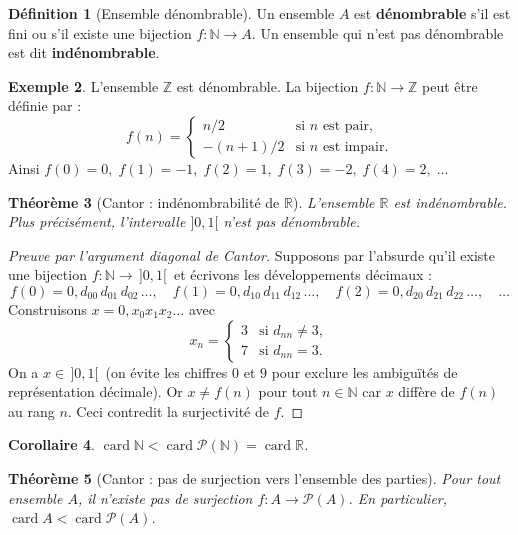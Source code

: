 \documentclass[12pt,a4paper,openany]{book}
\theoremstyle{definition}
\newtheorem{definition}{Définition}[chapter]
\newtheorem{exemple}[definition]{Exemple}
\theoremstyle{plain}
\newtheorem{theoreme}[definition]{Théorème}
\newtheorem{corollaire}[definition]{Corollaire}
\theoremstyle{remark}
\newcommand{\N}{\mathbb{N}}
\newcommand{\Z}{\mathbb{Z}}
\newcommand{\R}{\mathbb{R}}
\newcommand{\powerset}{\mathcal{P}}
\DeclareMathOperator{\card}{card}
\begin{document}
\begin{definition}[Ensemble dénombrable]\label{def:denombrable}
Un ensemble $A$ est \textbf{dénombrable} s'il est fini ou s'il existe une
bijection $f \colon \N \to A$. Un ensemble qui n'est pas dénombrable est dit
\textbf{indénombrable}.
\end{definition}

\begin{exemple}\label{ex:Z-denombrable}
L'ensemble $\Z$ est dénombrable. La bijection $f \colon \N \to \Z$ peut être
définie par :
\[
  f(n) = \begin{cases} n/2 & \text{si } n \text{ est pair,} \\ -(n+1)/2 & \text{si } n \text{ est impair.} \end{cases}
\]
Ainsi $f(0)=0,\; f(1)=-1,\; f(2)=1,\; f(3)=-2,\; f(4)=2,\; \ldots$
\end{exemple}

\begin{theoreme}[Cantor : indénombrabilité de $\R$]\label{thm:cantor-diagonal}
L'ensemble $\R$ est indénombrable. Plus précisément, l'intervalle
$]0,1[$ n'est pas dénombrable.
\end{theoreme}

\begin{proof}[Preuve par l'argument diagonal de Cantor]
Supposons par l'absurde qu'il existe une bijection $f \colon \N \to \,]0,1[\,$
et écrivons les développements décimaux :
\[
  f(0) = 0{,}d_{00}\,d_{01}\,d_{02}\,\ldots, \quad
  f(1) = 0{,}d_{10}\,d_{11}\,d_{12}\,\ldots, \quad
  f(2) = 0{,}d_{20}\,d_{21}\,d_{22}\,\ldots, \quad \ldots
\]
Construisons $x = 0{,}x_0 x_1 x_2 \ldots$ avec
\[
  x_n = \begin{cases} 3 & \text{si } d_{nn} \neq 3, \\ 7 & \text{si } d_{nn} = 3. \end{cases}
\]
On a $x \in \,]0,1[\,$ (on évite les chiffres $0$ et $9$ pour exclure les
ambiguïtés de représentation décimale). Or $x \neq f(n)$ pour tout
$n \in \N$ car $x$ diffère de $f(n)$ au rang $n$. Ceci contredit la
surjectivité de $f$.
\end{proof}

\begin{corollaire}\label{cor:powerset-N}
$\card{\N} < \card{\powerset(\N)} = \card{\R}$.
\end{corollaire}

\begin{theoreme}[Cantor : pas de surjection vers l'ensemble des parties]\label{thm:cantor-general}
Pour tout ensemble $A$, il n'existe pas de surjection $f \colon A \to \powerset(A)$.
En particulier, $\card{A} < \card{\powerset(A)}$.
\end{theoreme}
\end{document}

